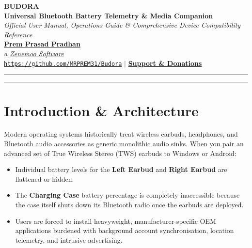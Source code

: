 \documentclass[11pt,a4paper]{article}
\begin{document}
\begin{center}
    {\Huge \textbf{\color{BudoraDark} BUDORA \raisebox{1pt}{\large \color{BudoraGreen} \textbullet}}} \\[6pt]
    {\Large \textbf{Universal Bluetooth Battery Telemetry \& Media Companion}} \\[4pt]
    {\large \textit{Official User Manual, Operations Guide \& Comprehensive Device Compatibility Reference}} \\[14pt]
    
    \textbf{\href{https://mrprem.in/}{Prem Prasad Pradhan}} \\
    \textit{a \href{https://www.zenemoo.in/}{Zenemoo Software}} \\[8pt]
    
    \href{https://github.com/MRPREM31/Budora}{\texttt{https://github.com/MRPREM31/Budora}} \quad $\vert$ \quad
    \href{https://www.zenemoo.in/support-zenemooindia}{\textbf{\color{BudoraPurple} Support \& Donations}} \\[14pt]
    \rule{\linewidth}{1.2pt}
\end{center}

\vspace{0.5cm}

\tableofcontents

\vspace{0.8cm}
\hrule
\vspace{0.8cm}

\section{Introduction \& Architecture}

Modern operating systems historically treat wireless earbuds, headphones, and Bluetooth audio accessories as generic monolithic audio sinks. When you pair an advanced set of True Wireless Stereo (TWS) earbuds to Windows or Android:
\begin{itemize}
    \item Individual battery levels for the \textbf{Left Earbud} and \textbf{Right Earbud} are flattened or hidden.
    \item The \textbf{Charging Case} battery percentage is completely inaccessible because the case itself shuts down its Bluetooth radio once the earbuds are deployed.
    \item Users are forced to install heavyweight, manufacturer-specific OEM applications burdened with background account synchronisation, location telemetry, and intrusive advertising.
\end{itemize}
\end{document}

